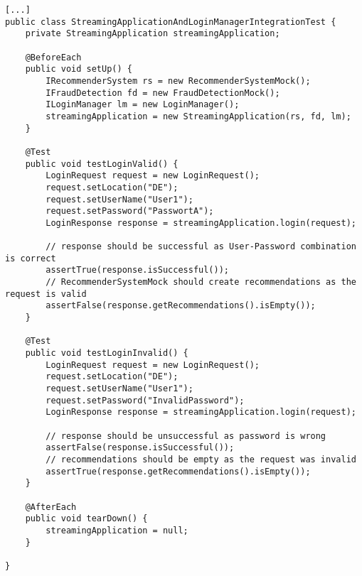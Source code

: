 \begin{lstlisting}[style=javastyle, caption=StreamingApplication Integration Test mit LoginManager]
[...]
public class StreamingApplicationAndLoginManagerIntegrationTest {
    private StreamingApplication streamingApplication;

    @BeforeEach
    public void setUp() {
        IRecommenderSystem rs = new RecommenderSystemMock();
        IFraudDetection fd = new FraudDetectionMock();
        ILoginManager lm = new LoginManager();
        streamingApplication = new StreamingApplication(rs, fd, lm);
    }

    @Test
    public void testLoginValid() {
        LoginRequest request = new LoginRequest();
        request.setLocation("DE");
        request.setUserName("User1");
        request.setPassword("PasswortA");
        LoginResponse response = streamingApplication.login(request);

        // response should be successful as User-Password combination is correct
        assertTrue(response.isSuccessful());
        // RecommenderSystemMock should create recommendations as the request is valid
        assertFalse(response.getRecommendations().isEmpty());
    }

    @Test
    public void testLoginInvalid() {
        LoginRequest request = new LoginRequest();
        request.setLocation("DE");
        request.setUserName("User1");
        request.setPassword("InvalidPassword");
        LoginResponse response = streamingApplication.login(request);

        // response should be unsuccessful as password is wrong
        assertFalse(response.isSuccessful());
        // recommendations should be empty as the request was invalid
        assertTrue(response.getRecommendations().isEmpty());
    }

    @AfterEach
    public void tearDown() {
        streamingApplication = null;
    }

}
\end{lstlisting}